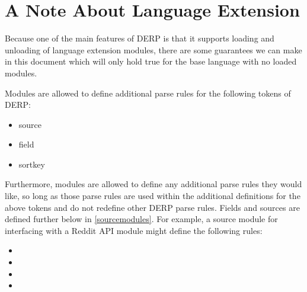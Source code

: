 \section{A Note About Language Extension}
Because one of the main features of DERP is that it supports loading and unloading
of language extension modules, there are some guarantees we can make in this document
which will only hold true for the base language with no loaded modules.

Modules are allowed to define additional parse rules for the following tokens of DERP:
\begin{itemize}
\item source
\item field
\item sortkey
\end{itemize}
Furthermore, modules are allowed to define any additional parse rules they would like, so
long as those parse rules are used within the additional definitions for the above tokens
and do not redefine other DERP parse rules. Fields and sources are defined further below in \ref{sourcemodules}.
For example, a source module for interfacing with a Reddit API module might define the following rules:

\begin{itemize}[leftmargin=1in]
    \item[\nonterminal{source}] \bnf{:}   \bnf{|} 
    \item[\nonterminal{field}]\bnf{:}  \bnf{|}  \bnf{|}  \bnf{|}  
    \item[\nonterminal{nsfw}] \bnf{:}  \bnf{|} 
    \item[\nonterminal{sortkey}] \bnf{:}   
\end{itemize}
